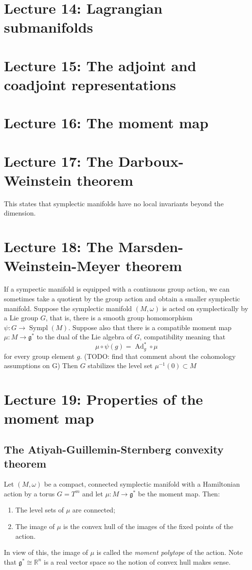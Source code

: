 \documentclass[11pt]{article} %
\begin{document}
\section*{Lecture 14: Lagrangian submanifolds}


\section*{Lecture 15: The adjoint and coadjoint representations}

\section*{Lecture 16: The moment map} 

\section*{Lecture 17: The Darboux-Weinstein theorem}
This states that symplectic manifolds have no local invariants beyond the dimension. 

\section*{Lecture 18: The Marsden-Weinstein-Meyer theorem}
If a sympectic manifold is equipped with a continuous group action, we can sometimes take a quotient by the group action and obtain a smaller symplectic manifold. Suppose the symplectic manifold $(M,\omega)$ is acted on symplectically by a Lie group $G$, that is, there is a smooth group homomorphism $\psi: G \rightarrow \operatorname{Sympl}(M)$. Suppose also that there is a compatible moment map $\mu: M \rightarrow \mathfrak{g}^\ast$ to the dual of the Lie algebra of $G$, compatibility meaning that
$$
\mu \circ \psi (g) = \operatorname{Ad}^\ast_g \circ \mu
$$
for every group element $g$.
(TODO: find that comment about the cohomology assumptions on G)
Then $G$ stabilizes the level set $\mu^{-1}(0) \subset M$


\section*{Lecture 19: Properties of the moment map}
\subsection*{The Atiyah-Guillemin-Sternberg convexity theorem}
Let $(M, \omega)$ be a compact, connected symplectic manifold with a Hamiltonian action by a torus $G = T^m$ and let $\mu: M \rightarrow \mathfrak{g}^\ast$ be the moment map. Then:
\begin{enumerate}
\item The level sets of $\mu$ are connected;
\item The image of $\mu$ is the convex hull of the images of the fixed points of the action.
\end{enumerate}
In view of this, the image of $\mu$ is called the \emph{moment polytope} of the action. Note that $\mathfrak{g}^\ast \cong \mathbb{R}^n$ is a real vector space so the notion of convex hull makes sense. 
\end{document}

